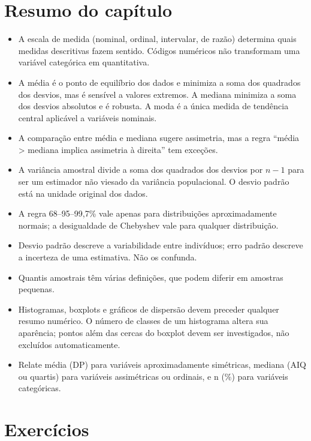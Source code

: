 \documentclass[
]{book}
\providecommand{\tightlist}{%
  \setlength{\itemsep}{0pt}\setlength{\parskip}{0pt}}
\begin{document}
\section{Resumo do capítulo}\label{resumo-do-capuxedtulo-3}

\begin{itemize}
\tightlist
\item
  A escala de medida (nominal, ordinal, intervalar, de razão) determina quais medidas descritivas fazem sentido. Códigos numéricos não transformam uma variável categórica em quantitativa.
\item
  A média é o ponto de equilíbrio dos dados e minimiza a soma dos quadrados dos desvios, mas é sensível a valores extremos. A mediana minimiza a soma dos desvios absolutos e é robusta. A moda é a única medida de tendência central aplicável a variáveis nominais.
\item
  A comparação entre média e mediana sugere assimetria, mas a regra ``média \textgreater{} mediana implica assimetria à direita'' tem exceções.
\item
  A variância amostral divide a soma dos quadrados dos desvios por \(n - 1\) para ser um estimador não viesado da variância populacional. O desvio padrão está na unidade original dos dados.
\item
  A regra 68--95--99,7\% vale apenas para distribuições aproximadamente normais; a desigualdade de Chebyshev vale para qualquer distribuição.
\item
  Desvio padrão descreve a variabilidade entre indivíduos; erro padrão descreve a incerteza de uma estimativa. Não os confunda.
\item
  Quantis amostrais têm várias definições, que podem diferir em amostras pequenas.
\item
  Histogramas, boxplots e gráficos de dispersão devem preceder qualquer resumo numérico. O número de classes de um histograma altera sua aparência; pontos além das cercas do boxplot devem ser investigados, não excluídos automaticamente.
\item
  Relate média (DP) para variáveis aproximadamente simétricas, mediana (AIQ ou quartis) para variáveis assimétricas ou ordinais, e n (\%) para variáveis categóricas.
\end{itemize}

\section{Exercícios}\label{exercuxedcios-3}
\end{document}
